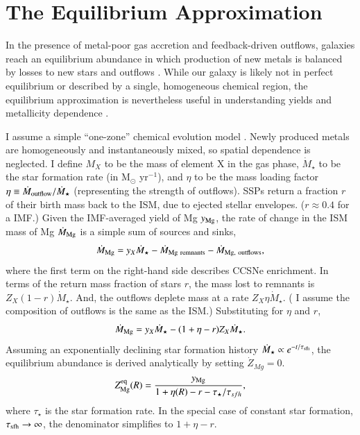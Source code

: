 \documentclass[12pt,oneside]{report}
\begin{document}
\chapter{The Equilibrium Approximation}\label{sec:equilibrium}

In the presence of metal-poor gas accretion and feedback-driven outflows, galaxies reach an equilibrium abundance in which production of new metals is balanced by losses to new stars and outflows \citep{larson72, dalcanton07, FD08, PS11, lilly13}.
While our galaxy is likely not in perfect equilibrium or described by a single, homogeneous chemical region, the equilibrium approximation is nevertheless useful in understanding yields and metallicity dependence \citep[e.g.][]{james_dwarf,james+23,WAF17}. 

I assume a simple ``one-zone'' chemical evolution model \cite[e.g.][]{tinsley80, pagel09, matteucci21}.  Newly produced metals are homogeneously and instantaneously mixed, so spatial dependence is neglected.
I define $M_{X}$ to be the mass of element X in the gas phase, $\dot{M}_\star$ to be the star formation rate (in M$_\odot$ yr$^{-1}$), and $\eta$ to be the mass loading factor $\eta\equiv\dot{M}_{\rm outflow}/\dot{M}_\star$ (representing the strength of outflows).
SSPs return a fraction $r$ of their birth mass back to the ISM, due to ejected stellar envelopes. ($r\approx0.4$ for a \citealt{kroupa01} IMF.)
Given the IMF-averaged yield of Mg $y_{\rm Mg}$, the rate of change in the ISM mass of Mg $\dot{M}_{\rm Mg}$ is a simple sum of sources and sinks,
\begin{equation}
    \dot{M}_{\rm Mg} =  y_{X}\dot{M}_\star - \dot{M}_{\rm Mg~remnants} - \dot{M}_{\rm Mg,~outflows},
\end{equation}
where the first term on the right-hand side describes CCSNe enrichment. 
In terms of the return mass fraction of stars $r$, the mass lost to remnants is $Z_X (1-r)\dot{M}_\star$.  And, the outflows deplete mass at a rate $Z_X \eta\dot{M}_\star$. ( I assume the composition of outflows is the same as the ISM.) Substituting for $\eta$ and $r$,  
\begin{equation}
    \dot{M}_{\rm Mg}= y_{X} \dot{M}_\star - (1 + \eta - r) Z_{X} \dot{M}_\star.
\end{equation}
Assuming an exponentially declining star formation history $\dot{M}_\star \propto e^{-t/\tau_{\rm sfh}}$, the equilibrium abundance is derived analytically by setting $\dot{Z}_{Mg}=0$.
\begin{equation}\label{eq:z_eq}
    Z_{\rm Mg}^{\rm eq}(R) = \frac{y_{\rm Mg}}{1 + \eta(R) - r - \tau_\star / \tau_{sfh}},
\end{equation}
where $\tau_{\star}$ is the star formation rate.
In the special case of constant star formation, $\tau_{\rm sfh}\to\infty$, the denominator simplifies to $1+\eta-r$.
\end{document}
